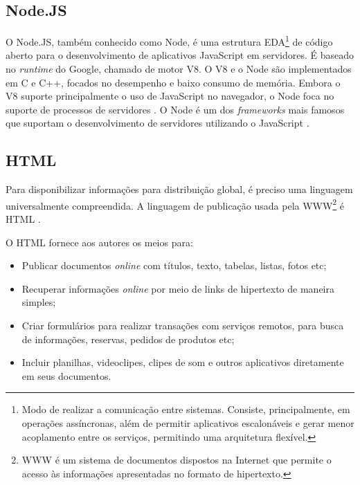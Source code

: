 
\subsection{Node.JS}

O Node.JS, também conhecido como Node, é uma estrutura EDA\footnote{Modo de realizar a comunicação entre sistemas. Consiste, principalmente, em operações assíncronas, além de permitir aplicativos escalonáveis e gerar menor acoplamento entre os serviços, permitindo uma arquitetura flexível.} de código aberto para o desenvolvimento de aplicativos JavaScript em servidores. É baseado no \textit{runtime} do Google, chamado de motor V8. O V8 e o Node são implementados em C e C++, focados no desempenho e baixo consumo de memória. Embora o V8 suporte principalmente o uso de JavaScript no navegador, o Node foca no suporte de processos de servidores \cite{Tilkov2010}.
%
O Node é um dos \textit{frameworks} mais famosos que suportam o desenvolvimento de servidores utilizando o JavaScript \cite{Tilkov2010}.


\subsection{HTML}

Para disponibilizar informações para distribuição global, é preciso uma linguagem universalmente compreendida. A linguagem de publicação usada pela WWW\footnote{WWW é um sistema de documentos dispostos na Internet que permite o acesso às informações apresentadas no formato de hipertexto.} é HTML \cite{html}.

O HTML fornece aos autores os meios para: 
\begin{itemize}
    \item Publicar documentos \textit{online} com títulos, texto, tabelas, listas, fotos etc;
    \item Recuperar informações \textit{online} por meio de links de hipertexto de maneira simples;
    \item Criar formulários para realizar transações com serviços remotos, para busca de informações, reservas, pedidos de produtos etc;
    \item Incluir planilhas, videoclipes, clipes de som e outros aplicativos diretamente em seus documentos.
\end{itemize}

